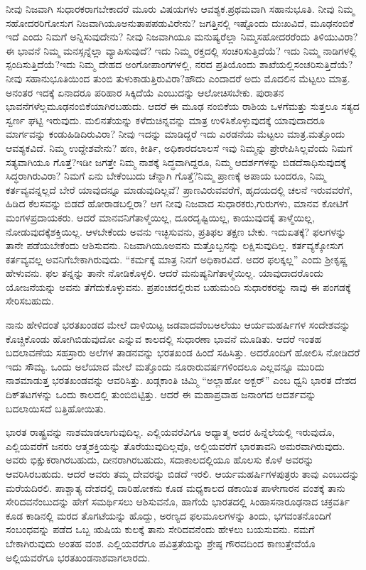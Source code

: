 ನೀವು ನಿಜವಾಗಿ ಸುಧಾರಕರಾಗಬೇಕಾದರೆ ಮೂರು ವಿಷಯಗಳು ಆವಶ್ಯಕ.\break ಪ್ರಥಮವಾಗಿ ಸಹಾನುಭೂತಿ. ನೀವು ನಿಮ್ಮ ಸಹೋದರರಿಗೋಸುಗ ನಿಜವಾಗಿಯೂ\break ಅನುತಾಪಪಡುವಿರೇನು? ಜಗತ್ತಿನಲ್ಲಿ ಇಷ್ಟೊಂದು ದುಃಖವಿದೆ, ಮೂಢನಂಬಿಕೆ ಇದೆ ಎಂದು ನಿಮಗೆ ಅನ್ನಿಸುವುದೇನು? ನೀವು ನಿಜವಾಗಿಯೂ ಮನುಷ್ಯರೆಲ್ಲಾ ನಿಮ್ಮ\break ಸಹೋದರರೆಂದು ತಿಳಿಯುವಿರಾ? ಈ ಭಾವನೆ ನಿಮ್ಮ ಮನಸ್ಸನ್ನೆಲ್ಲಾ ವ್ಯಾಪಿಸುವುದೆ? ಇದು ನಿಮ್ಮ ರಕ್ತದಲ್ಲಿ ಸಂಚರಿಸುತ್ತಿದೆಯೆ? ಇದು ನಿಮ್ಮ ನಾಡಿಗಳಲ್ಲಿ ಸ್ಪಂದಿಸುತ್ತಿದೆಯೆ?\break ಇದು ನಿಮ್ಮ ದೇಹದ ಅಂಗೋಪಾಂಗಗಳಲ್ಲಿ, ನರದ ಪ್ರತಿಯೊಂದು ಶಾಖೆಯಲ್ಲಿ\break ಸಂಚರಿಸುತ್ತಿದೆಯೆ? ನೀವು ಸಹಾನುಭೂತಿಯಿಂದ ತುಂಬಿ ತುಳುಕಾಡುತ್ತಿರುವಿರಾ?\break ಹೌದು ಎಂದಾದರೆ ಅದು ಮೊದಲಿನ ಮೆಟ್ಟಲು ಮಾತ್ರ. ಅನಂತರ ಇದಕ್ಕೆ ಏನಾದರೂ ಪರಿಹಾರ ಸಿಕ್ಕಿದೆಯೆ ಎಂಬುದನ್ನು ಆಲೋಚಿಸಬೇಕು. ಪುರಾತನ ಭಾವನೆಗಳೆಲ್ಲ\break ಮೂಢನಂಬಿಕೆಯಾಗಿರಬಹುದು. ಆದರೆ ಈ ಮೂಢ ನಂಬಿಕೆಯ ರಾಶಿಯ ಒಳಗೆ\break ಮತ್ತು ಸುತ್ತಲೂ ಸತ್ಯದ ಸ್ವರ್ಣ ಘಟ್ಟಿ ಇರುವುದು. ಮಲಿನತೆಯನ್ನು ಕಳೆದು\break ಚಿನ್ನವನ್ನು ಮಾತ್ರ ಉಳಿಸಿಕೊಳ್ಳುವುದಕ್ಕೆ ಯಾವುದಾದರೂ ಮಾರ್ಗವನ್ನು ಕಂಡುಹಿಡಿ\-ದಿರುವಿರಾ? ನೀವು ಇದನ್ನು ಮಾಡಿದ್ದರೆ ಇದು ಎರಡನೆಯ ಮೆಟ್ಟಲು ಮಾತ್ರ.\break ಮತ್ತೊಂದು ಆವಶ್ಯಕವಿದೆ. ನಿಮ್ಮ ಉದ್ದೇಶವೇನು? ಹಣ, ಕೀರ್ತಿ, ಅಧಿಕಾರದ\break ಲಾಲಸೆ ಇವು ನಿಮ್ಮನ್ನು ಪ್ರೇರೇಪಿಸಿಲ್ಲವೆಂದು ನಿಮಗೆ ಸತ್ಯವಾಗಿಯೂ ಗೊತ್ತೆ?\break ಇಡೀ ಜಗತ್ತೇ ನಿಮ್ಮ ನಾಶಕ್ಕೆ ಸಿದ್ಧವಾಗಿದ್ದರೂ, ನಿಮ್ಮ ಆದರ್ಶಗಳನ್ನು ಬಿಡದೆ\break ಸಾಧಿಸುವುದಕ್ಕೆ ಸಿದ್ಧರಾಗಿರುವಿರಾ? ನಿಮಗೆ ಏನು ಬೇಕೆಂಬುದು ಚೆನ್ನಾಗಿ ಗೊತ್ತೆ?\break ನಿಮ್ಮ ಪ್ರಾಣಕ್ಕೆ ಅಪಾಯ ಬಂದರೂ, ನಿಮ್ಮ ಕರ್ತವ್ಯವನ್ನಲ್ಲದೆ ಬೇರೆ ಯಾವುದನ್ನೂ ಮಾಡುವುದಿಲ್ಲವೆ? ಪ್ರಾಣವಿರುವವರೆಗೆ, ಹೃದಯದಲ್ಲಿ ಚಲನೆ ಇರುವವರೆಗೆ, ಹಿಡಿದ ಕೆಲಸವನ್ನು ಬಿಡದೆ ಹೋರಾಡಬಲ್ಲಿರಾ? ಆಗ ನೀವು ನಿಜವಾದ ಸುಧಾರಕರು,\break ಗುರುಗಳು, ಮಾನವ ಕೋಟಿಗೆ ಮಂಗಳಪ್ರದಾಯಕರು. ಆದರೆ ಮಾನವನಿಗೆ\break ತಾಳ್ಮೆಯಿಲ್ಲ, ದೂರದೃಷ್ಟಿಯಿಲ್ಲ, ಕಾಯುವುದಕ್ಕೆ ತಾಳ್ಮೆಯಿಲ್ಲ, ನೋಡುವುದಕ್ಕೆ\break ಶಕ್ತಿಯಿಲ್ಲ. ಆಳಬೇಕೆಂದು ಅವನು ಇಚ್ಛಿಸುವನು, ಪ್ರತಿಫಲ ತಕ್ಷಣ ಬೇಕು. ಇದು\break ಏತಕ್ಕೆ? ಫಲಗಳನ್ನು ತಾನೇ ಪಡೆಯಬೇಕೆಂದು ಆಶಿಸುವನು. ನಿಜವಾಗಿಯೂ\break ಅವನು ಮತ್ತೊಬ್ಬನನ್ನು ಲಕ್ಷಿಸುವುದಿಲ್ಲ. ಕರ್ತವ್ಯಕ್ಕೋಸುಗ ಕರ್ತವ್ಯವಲ್ಲ ಅವನಿಗೆ\break ಬೇಕಾಗಿರುವುದು. “ಕರ್ಮಕ್ಕೆ ಮಾತ್ರ ನಿನಗೆ ಅಧಿಕಾರವಿದೆ. ಅದರ ಫಲಕ್ಕಲ್ಲ” ಎಂದು ಶ‍್ರೀಕೃಷ್ಣ ಹೇಳುವನು. ಫಲ ತನ್ನನ್ನು ತಾನೇ ನೋಡಿಕೊಳ್ಳಲಿ. ಆದರೆ ಮನುಷ್ಯನಿಗೆ\break ತಾಳ್ಮೆಯಿಲ್ಲ. ಯಾವುದಾದರೊಂದು ಯೋಜನೆಯನ್ನು ಅವನು ತೆಗೆದುಕೊಳ್ಳುವನು. ಪ್ರಪಂಚದಲ್ಲಿರುವ ಬಹುಮಂದಿ ಸುಧಾರಕರನ್ನು ನಾವು ಈ ಪಂಗಡಕ್ಕೆ ಸೇರಿಸಬಹುದು.

ನಾನು ಹೇಳಿದಂತೆ ಭರತಖಂಡದ ಮೇಲೆ ದಾಳಿಯಿಟ್ಟ ಜಡವಾದವೆಂಬ\break ಅಲೆಯು ಆರ್ಯಮಹರ್ಷಿಗಳ ಸಂದೇಶವನ್ನು ಕೊಚ್ಚಿಕೊಂಡು ಹೋಗಿಬಿಡುವುದೋ ಎನ್ನುವ ಕಾಲದಲ್ಲಿ ಸುಧಾರಣಾ ಭಾವನೆ ಮೂಡಿತು. ಆದರೆ ಇಂತಹ ಬದಲಾವಣೆಯ ಸಹಸ್ರಾರು ಅಲೆಗಳ ತಾಡನವನ್ನು ಭರತಖಂಡ ಹಿಂದೆ ಸಹಿಸಿತ್ತು. ಅದರೊಂದಿಗೆ ಹೋಲಿಸಿ ನೋಡಿದರೆ ಇದು ಸೌಮ್ಯ. ಒಂದು ಅಲೆಯಾದ ಮೇಲೆ ಮತ್ತೊಂದು ನೂರಾರು\break ವರ್ಷಗಳಿಂದಲೂ ಎಲ್ಲವನ್ನೂ ಮುರಿದು ನಾಶಮಾಡುತ್ತ ಭರತಖಂಡವನ್ನು ಆವರಿಸಿತ್ತು. ಖಡ್ಗಕಾಂತಿ ಚಿಮ್ಮಿ “ಅಲ್ಲಾಹೋ ಅಕ್ಬರ್​” ಎಂಬ ಧ್ವನಿ ಭಾರತ ದೇಶದ ದಿಕ್​ತಟಗಳನ್ನು ಒಂದು ಕಾಲದಲ್ಲಿ ತುಂಬಿಬಿಟ್ಟಿತ್ತು. ಆದರೆ ಈ ಮಹಾಪ್ರವಾಹ ಜನಾಂಗದ ಆದರ್ಶವನ್ನು ಬದಲಾಯಿಸದೆ ಬತ್ತಿಹೋಯಿತು.

ಭಾರತ ರಾಷ್ಟ್ರವನ್ನು ನಾಶಮಾಡಲಾಗುವುದಿಲ್ಲ. ಎಲ್ಲಿಯವರೆವಿಗೂ ಅಧ್ಯಾತ್ಮ ಅದರ ಹಿನ್ನೆಲೆಯಲ್ಲಿ ಇರುವುದೊ, ಎಲ್ಲಿಯವರೆಗೆ ಜನರು ಆತ್ಮಶಕ್ತಿಯನ್ನು ತೊರೆಯುವುದಿಲ್ಲವೊ, ಅಲ್ಲಿಯವರೆಗೆ ಭಾರತಾವನಿ ಅಮರವಾಗಿರುವುದು. ಅವರು ಭಿಕ್ಷುಕರಾಗಿರಬಹುದು, ದೀನರಾಗಿರಬಹುದು, ಸದಾಕಾಲದಲ್ಲಿಯೂ ಹೊಲಸು ಕೊಳೆ ಅವರನ್ನು ಆವರಿಸಿರಬಹುದು. ಆದರೆ ಅವರು ತಮ್ಮ ದೇವರನ್ನು ಬಿಡದೆ ಇರಲಿ. ಆರ್ಯಮಹರ್ಷಿಗಳ\break ಪುತ್ರರು ತಾವು ಎಂಬುದನ್ನು ಮರೆಯದಿರಲಿ. ಪಾಶ್ಚಾತ್ಯ ದೇಶದಲ್ಲಿ ದಾರಿಹೋಕನು ಕೂಡ ಮಧ್ಯಕಾಲದ ಡಕಾಯಿತ ಪಾಳೇಗಾರನ ವಂಶಕ್ಕೆ ತಾನು ಸೇರಿದವನೆಂಬುದನ್ನು ಹೇಗೆ ಸಮರ್ಥಿಸಲು ಆಶಿಸುವನೊ, ಹಾಗೆಯೆ ಭಾರತದಲ್ಲಿ ಸಿಂಹಾಸನಾರೂಢನಾದ ಚಕ್ರವರ್ತಿ ಕೂಡ ಕಾಡಿನಲ್ಲಿ ಮರದ ತೊಗಟೆಯನ್ನು ಹೊದ್ದು, ಅರಣ್ಯದ ಫಲಮೂಲಗಳನ್ನು ತಿಂದು, ಭಗವಂತನೊಂದಿಗೆ ಸಂಬಂಧವನ್ನು ಪಡೆದ ಒಬ್ಬ ಋಷಿಯ ಕುಲಕ್ಕೆ ತಾನು ಸೇರಿದವನೆಂದು ಹೇಳಲು ಬಯಸುವನು. ನಮಗೆ ಬೇಕಾಗಿರುವುದು ಅಂತಹ ವಂಶ. ಎಲ್ಲಿಯವರೆಗೂ ಪವಿತ್ರತೆಯನ್ನು ಶ್ರೇಷ್ಠ ಗೌರವದಿಂದ ಕಾಣುತ್ತೇವೆಯೊ ಅಲ್ಲಿಯವರೆಗೂ ಭರತಖಂಡ\break ನಾಶವಾಗಲಾರದು.

